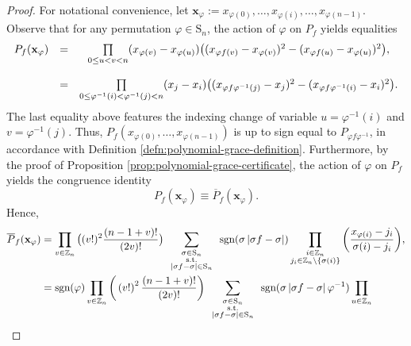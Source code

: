 \begin{proof}
For notational convenience, let $\mathbf{x}_{\varphi}:=x_{\varphi(0)},\ldots,x_{\varphi(i)},\ldots,x_{\varphi(n-1)}$. Observe that for any permutation $\varphi\in \text{S}_n$, the action of $\varphi$ on $P_f$ yields equalities
 \[
 \begin{array}{ccc}
P_{f}({\bf x}_{\varphi}) & = & \underset{0\le u<v<n}{\prod}(x_{\varphi(v)}-x_{\varphi(u)})\big((x_{\varphi f(v)}-x_{\varphi(v)})^{2}-(x_{\varphi f(u)}-x_{\varphi(u)})^{2}\big),\\
\\
 & = & \underset{0\le\varphi^{-1}(i)<\varphi^{-1}(j)<n}{\prod}(x_{j}-x_{i})\big((x_{\varphi f\varphi^{-1}(j)}-x_{j})^{2}-(x_{\varphi f\varphi^{-1}(i)}-x_{i})^{2}\big).
\end{array}
 \]
 The last equality above features the indexing change of variable $u=\varphi^{-1}(i)$ and $v=\varphi^{-1}(j)$. Thus, $P_{f}(x_{\varphi(0)},\ldots,x_{\varphi(n-1)})$ is up to sign equal to $P_{\varphi f\varphi^{-1}}$, in accordance with Definition \ref{defn:polynomial-grace-definition}. Furthermore, by the proof of Proposition \ref{prop:polynomial-grace-certificate}, the action of $\varphi$
on $P_{f}$ yields the congruence identity
\[
P_{f}(\mathbf{x}_{\varphi})\equiv \overline{P}_f(\mathbf{x}_{\varphi}).
\]
Hence,
\begin{align*}\overline{P}_{f}({\bf x}_{\varphi}) & =\prod_{v\in\mathbb{Z}_{n}}\big((v!)^{2}\frac{(n-1+v)!}{(2v)!}\big)\sum_{\begin{array}{c}
\substack{\sigma\in\text{S}_{n}\\
\text{s.t.}\\
\left|\sigma f-\sigma\right|\in\text{S}_{n}
}
\end{array}}\text{sgn}(\sigma\left|\sigma f-\sigma\right|)\prod_{\substack{i\in\mathbb{Z}_{n}\\
j_{i}\in\mathbb{Z}_{n}\backslash\{\sigma(i)\}
}
}\bigg(\frac{x_{\varphi(i)}-j_{i}}{\sigma(i)-j_{i}}\bigg),\\
 & =\text{sgn}(\varphi)\prod_{v\in\mathbb{Z}_{n}}\bigg(\left(v!\right)^{2}\frac{\left(n-1+v\right)!}{\left(2v\right)!}\bigg)\sum_{\begin{array}{c}
\substack{\sigma\in\text{S}_{n}\\
\text{s.t.}\\
\left|\sigma f-\sigma\right|\in\text{S}_{n}
}
\end{array}}\text{sgn}(\sigma\left|\sigma f-\sigma\right|\varphi^{-1})\prod_{\substack{u\in\mathbb{Z}_{n}\\
}}
\end{align*}
\end{proof}
